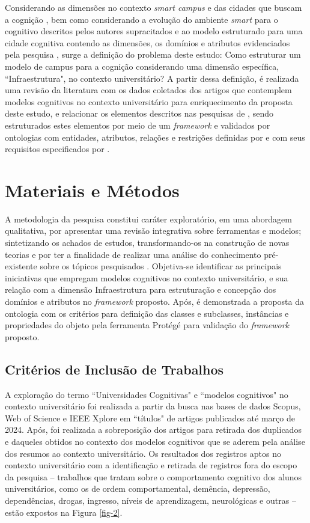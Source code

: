 \documentclass[portuguese]{textolivre}
\begin{document}
Considerando as dimensões no contexto \textit{smart campus} \cite{giuriatti2023} e das cidades que buscam a cognição \cite{giuriatti2024}, bem como considerando a evolução do ambiente \textit{smart} para o cognitivo descritos pelos autores supracitados e ao modelo estruturado para uma cidade cognitiva contendo as dimensões, os domínios e atributos evidenciados pela pesquisa \cite{giuriatti2024}, surge a definição do problema deste estudo: Como estruturar um modelo de campus para a cognição considerando uma dimensão específica, ``Infraestrutura", no contexto universitário? A partir dessa definição, é realizada uma revisão da literatura com os dados coletados dos artigos que contemplem modelos cognitivos no contexto universitário para enriquecimento da proposta deste estudo, e relacionar os elementos descritos nas pesquisas de \textcite{giuriatti2023, giuriatti2024}, sendo estruturados estes elementos por meio de um \textit{framework} e validados por ontologias com entidades, atributos, relações e restrições definidas por  e com seus requisitos especificados por \textcite{freitas2004}.

\section{Materiais e Métodos}
A metodologia da pesquisa constitui caráter exploratório, em uma abordagem qualitativa, por apresentar uma revisão integrativa sobre ferramentas e modelos; sintetizando os achados de estudos, transformando-os na construção de novas teorias \cite{whitemore2005} e por ter a finalidade de realizar uma análise do conhecimento pré-existente sobre os tópicos pesquisados \cite{russell2005}. Objetiva-se identificar as principais iniciativas que empregam modelos cognitivos no contexto universitário, e sua relação com a dimensão Infraestrutura para estruturação e concepção dos domínios e atributos no \textit{framework} proposto. Após, é demonstrada a proposta da ontologia com os critérios para definição das classes e subclasses, instâncias e propriedades do objeto pela ferramenta Protégé para validação do \textit{framework} proposto.

\subsection{Critérios de Inclusão de Trabalhos}
A exploração do termo ``Universidades Cognitivas" e ``modelos cognitivos" no contexto universitário foi realizada a partir da busca nas bases de dados Scopus, Web of Science e IEEE Xplore em ``títulos" de artigos publicados até março de 2024. Após, foi realizada a sobreposição dos artigos para retirada dos duplicados e daqueles obtidos no contexto dos modelos cognitivos que se aderem pela análise dos resumos ao contexto universitário. Os resultados dos registros aptos no contexto universitário com a identificação e retirada de registros fora do escopo da pesquisa – trabalhos que tratam sobre o comportamento cognitivo dos alunos universitários, como os de ordem comportamental, demência, depressão, dependências, drogas, ingresso, níveis de aprendizagem, neurológicas e outras – estão expostos na Figura \ref{fig-2}.
\end{document}
